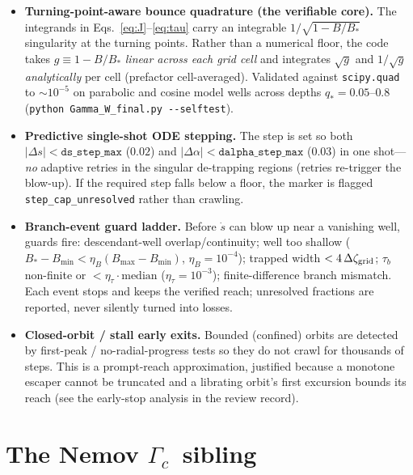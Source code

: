 \documentclass[11pt]{article}
\newcommand{\code}[1]{\texttt{#1}}
\newcommand{\Gc}{\ensuremath{\Gamma_c}}
\newcommand{\Bstar}{\ensuremath{B_\ast}}
\begin{document}
\begin{itemize}[nosep]
  \item \textbf{Turning-point-aware bounce quadrature (the verifiable core).} The integrands in
        Eqs.~\eqref{eq:J}--\eqref{eq:tau} carry an integrable $1/\sqrt{1-B/\Bstar}$ singularity at
        the turning points. Rather than a numerical floor, the code takes $g\equiv1-B/\Bstar$
        \emph{linear across each grid cell} and integrates $\sqrt{g}$ and $1/\sqrt{g}$
        \emph{analytically} per cell (prefactor cell-averaged). Validated against
        \code{scipy.quad} to $\sim10^{-5}$ on parabolic and cosine model wells across depths
        $q_\ast=0.05$--$0.8$ (\code{python Gamma\_W\_final.py -{}-selftest}).
  \item \textbf{Predictive single-shot ODE stepping.} The step is set so both
        $|\Delta s|<\code{ds\_step\_max}$ ($0.02$) and $|\Delta\alpha|<\code{dalpha\_step\_max}$
        ($0.03$) in one shot---\emph{no} adaptive retries in the singular de-trapping regions
        (retries re-trigger the blow-up). If the required step falls below a floor, the marker is
        flagged \code{step\_cap\_unresolved} rather than crawling.
  \item \textbf{Branch-event guard ladder.} Before $\dot s$ can blow up near a vanishing well,
        guards fire: descendant-well overlap/continuity; well too shallow
        ($\Bstar-B_{\min}<\eta_B(B_{\max}-B_{\min})$, $\eta_B=10^{-4}$); trapped width
        $<4\,\Delta\zeta_{\rm grid}$; $\tau_b$ non-finite or $<\eta_\tau\cdot\mathrm{median}$
        ($\eta_\tau=10^{-3}$); finite-difference branch mismatch. Each event stops and keeps the
        verified reach; unresolved fractions are reported, never silently turned into losses.
  \item \textbf{Closed-orbit / stall early exits.} Bounded (confined) orbits are detected by
        first-peak / no-radial-progress tests so they do not crawl for thousands of steps. This
        is a prompt-reach approximation, justified because a monotone escaper cannot be truncated
        and a librating orbit's first excursion bounds its reach (see the early-stop analysis in
        the review record).
\end{itemize}

\section{The Nemov \Gc\ sibling}
\label{sec:gammac}
\end{document}
